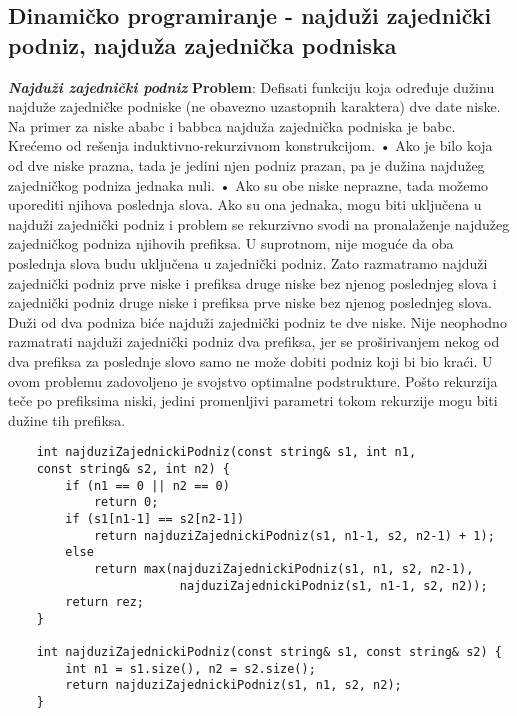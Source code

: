 \documentclass{article}
\begin{document}
\subsection{Dinamičko programiranje - najduži zajednički podniz, najduža zajednička podniska}
\textit{\textbf{Najduži zajednički podniz}}
\vspace{0.3cm}\newline
\textbf{Problem}: Defisati funkciju koja određuje dužinu najduže zajedničke podniske
(ne obavezno uzastopnih karaktera) dve date niske. Na primer za niske ababc i babbca najduža zajednička podniska je babc.
\newline
Krećemo od rešenja induktivno-rekurzivnom konstrukcijom.
\newline \hspace*{0.4cm}• Ako je bilo koja od dve niske prazna, tada je jedini njen podniz prazan, pa
je dužina najdužeg zajedničkog podniza jednaka nuli.
\newline \hspace*{0.4cm}• Ako su obe niske neprazne, tada možemo uporediti njihova poslednja slova.
Ako su ona jednaka, mogu biti uključena u najduži zajednički podniz i
problem se rekurzivno svodi na pronalaženje najdužeg zajedničkog podniza
njihovih prefiksa. U suprotnom, nije moguće da oba poslednja slova budu
uključena u zajednički podniz. Zato razmatramo najduži zajednički podniz
prve niske i prefiksa druge niske bez njenog poslednjeg slova i zajednički
podniz druge niske i prefiksa prve niske bez njenog poslednjeg slova. Duži
od dva podniza biće najduži zajednički podniz te dve niske. Nije neophodno razmatrati najduži zajednički podniz dva prefiksa, jer
se proširivanjem nekog od dva prefiksa za poslednje slovo samo ne može
dobiti podniz koji bi bio kraći. U ovom problemu
zadovoljeno je svojstvo optimalne podstrukture.
\newline
Pošto rekurzija teče po prefiksima niski, jedini promenljivi parametri tokom
rekurzije mogu biti dužine tih prefiksa.
\begin{lstlisting}
    int najduziZajednickiPodniz(const string& s1, int n1,
    const string& s2, int n2) {
        if (n1 == 0 || n2 == 0)
            return 0;
        if (s1[n1-1] == s2[n2-1])
            return najduziZajednickiPodniz(s1, n1-1, s2, n2-1) + 1);
        else
            return max(najduziZajednickiPodniz(s1, n1, s2, n2-1),
                        najduziZajednickiPodniz(s1, n1-1, s2, n2));
        return rez;
    }

    int najduziZajednickiPodniz(const string& s1, const string& s2) {
        int n1 = s1.size(), n2 = s2.size();
        return najduziZajednickiPodniz(s1, n1, s2, n2);
    }
\end{lstlisting}
\end{document}
